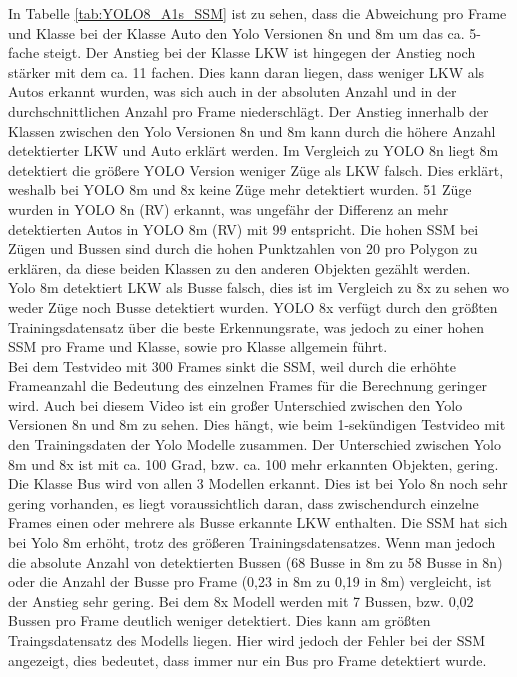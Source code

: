 {		In Tabelle \ref{tab:YOLO8_A1s_SSM} ist zu sehen, dass die Abweichung pro Frame und Klasse bei der Klasse Auto den Yolo Versionen 8n und 8m um das ca. 5-fache steigt. Der Anstieg bei der Klasse LKW ist hingegen der Anstieg noch stärker mit dem ca. 11 fachen. Dies kann daran liegen, dass weniger LKW als Autos erkannt wurden, was sich auch in der absoluten Anzahl und in der durchschnittlichen Anzahl pro Frame niederschlägt. Der Anstieg innerhalb der Klassen zwischen den Yolo Versionen 8n und 8m kann durch die höhere Anzahl detektierter LKW und Auto erklärt werden.
		Im Vergleich zu YOLO 8n liegt 8m detektiert die größere YOLO Version weniger Züge als LKW falsch. Dies erklärt, weshalb bei YOLO 8m und 8x keine Züge mehr detektiert wurden. 51 Züge wurden in YOLO 8n (RV) erkannt, was ungefähr der Differenz an mehr detektierten Autos in YOLO 8m (RV) mit 99 entspricht. Die hohen SSM bei Zügen und Bussen sind durch die hohen Punktzahlen von 20 pro Polygon zu erklären, da diese beiden Klassen zu den \glqq  anderen Objekten\grqq{} gezählt werden. \\
		Yolo 8m detektiert LKW als Busse falsch, dies ist im Vergleich zu 8x zu sehen wo weder Züge noch Busse detektiert wurden. YOLO 8x verfügt durch den größten Trainingsdatensatz über die beste Erkennungsrate, was jedoch zu einer hohen SSM pro Frame und Klasse, sowie pro Klasse allgemein führt. \\
		Bei dem Testvideo mit 300 Frames sinkt die SSM, weil durch die erhöhte Frameanzahl die Bedeutung des einzelnen Frames für die Berechnung geringer wird. Auch bei diesem Video ist ein großer Unterschied zwischen den Yolo Versionen 8n und 8m zu sehen. Dies hängt, wie beim 1-sekündigen Testvideo mit den Trainingsdaten der Yolo Modelle zusammen. Der Unterschied zwischen Yolo 8m und 8x ist mit ca. 100 Grad, bzw. ca. 100 mehr erkannten Objekten, gering. \\
		Die Klasse Bus wird von allen 3 Modellen erkannt. Dies ist bei Yolo 8n noch sehr gering vorhanden, es liegt voraussichtlich daran, dass zwischendurch einzelne Frames einen oder mehrere als Busse erkannte LKW enthalten. Die SSM hat sich bei Yolo 8m erhöht, trotz des größeren Trainingsdatensatzes. Wenn man jedoch die absolute Anzahl von detektierten Bussen (68 Busse in 8m zu 58 Busse in 8n) oder die Anzahl der Busse pro Frame (0,23 in 8m zu 0,19 in 8m) vergleicht, ist der Anstieg sehr gering. Bei dem 8x Modell werden mit 7 Bussen, bzw. 0,02 Bussen pro Frame deutlich weniger detektiert. Dies kann am größten Traingsdatensatz des Modells liegen. Hier wird jedoch der Fehler bei der SSM angezeigt, dies bedeutet, dass immer nur ein Bus pro Frame detektiert wurde. 
}
